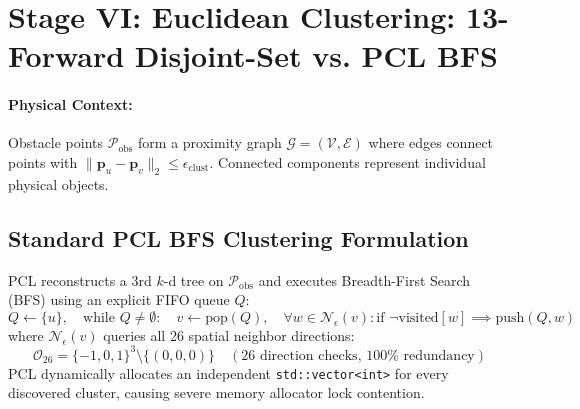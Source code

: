 \documentclass[11pt,a4paper]{article}
\begin{document}
\section{Stage VI: Euclidean Clustering: 13-Forward Disjoint-Set vs. PCL BFS}
\label{sec:clustering_math}

\paragraph{Physical Context:} Obstacle points $\mathcal{P}_{\text{obs}}$ form a proximity graph $\mathcal{G} = (\mathcal{V}, \mathcal{E})$ where edges connect points with $\|\bm{p}_u - \bm{p}_v\|_2 \le \epsilon_{\text{clust}}$. Connected components represent individual physical objects.

\subsection{Standard PCL BFS Clustering Formulation}
PCL reconstructs a 3rd $k$-d tree on $\mathcal{P}_{\text{obs}}$ and executes Breadth-First Search (BFS) using an explicit FIFO queue $Q$:
\begin{equation}
Q \leftarrow \{u\}, \quad \text{while } Q \neq \emptyset: \quad v \leftarrow \text{pop}(Q), \quad \forall w \in \mathcal{N}_{\epsilon}(v): \text{if } \neg\text{visited}[w] \implies \text{push}(Q, w)
\label{eq:pcl_clustering_math}
\end{equation}
where $\mathcal{N}_{\epsilon}(v)$ queries all 26 spatial neighbor directions:
\begin{equation}
\mathcal{O}_{26} = \{-1, 0, 1\}^3 \setminus \{(0, 0, 0)\} \quad (26\text{ direction checks, } 100\%\text{ redundancy})
\end{equation}
PCL dynamically allocates an independent \texttt{std::vector<int>} for every discovered cluster, causing severe memory allocator lock contention.
\end{document}
